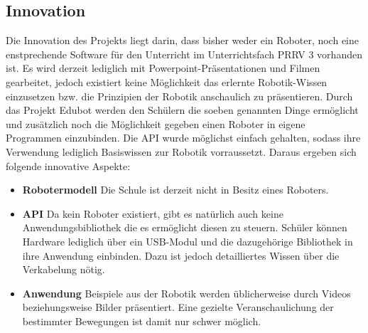 \subsection{Innovation}
Die Innovation des Projekts liegt darin, dass bisher weder ein Roboter, noch eine enstprechende Software für den Unterricht im Unterrichtsfach PRRV 3 vorhanden ist. Es wird derzeit lediglich mit Powerpoint-Präsentationen und Filmen gearbeitet, jedoch existiert keine Möglichkeit das erlernte Robotik-Wissen einzusetzen bzw. die Prinzipien der Robotik anschaulich zu präsentieren. 
\newline
Durch das Projekt Edubot werden den Schülern die soeben genannten Dinge ermöglicht und zusätzlich noch die Möglichkeit gegeben einen Roboter in eigene Programmen einzubinden. Die API wurde möglichst einfach gehalten, sodass ihre Verwendung lediglich Basiswissen zur Robotik vorraussetzt.
Daraus ergeben sich folgende innovative Aspekte:
\begin{itemize}
\item \textbf{Robotermodell}
\newline
Die Schule ist derzeit nicht in Besitz eines Roboters.
\item \textbf{API}
\newline
Da kein Roboter existiert, gibt es natürlich auch keine Anwendungsbibliothek die es ermöglicht diesen zu steuern. Schüler können Hardware lediglich über ein USB-Modul und die dazugehörige Bibliothek in ihre Anwendung einbinden. Dazu ist jedoch detailliertes Wissen über die Verkabelung nötig.
\item \textbf{Anwendung}
Beispiele aus der Robotik werden üblicherweise durch Videos beziehungsweise Bilder präsentiert. Eine gezielte Veranschaulichung der bestimmter Bewegungen ist damit nur schwer möglich.
\end{itemize}
